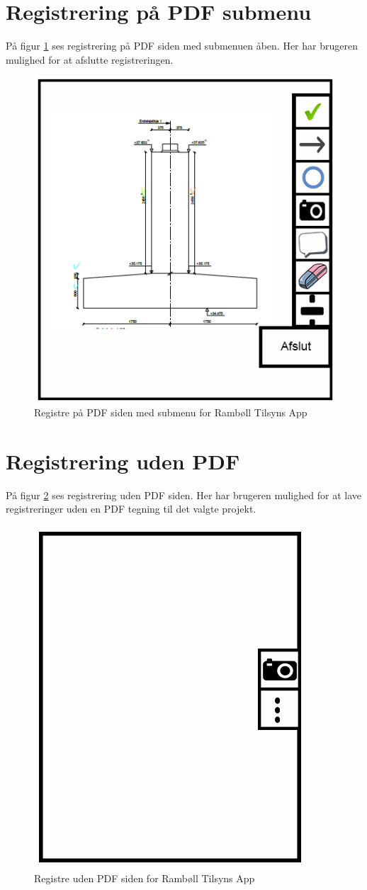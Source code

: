 \section{Registrering på PDF submenu}\label{sec:RegPaaPDFSubMock}
På figur \ref{fig:RegPaaPDFSubMock} ses registrering på PDF siden med submenuen åben. Her har brugeren mulighed for at afslutte registreringen.

\begin{figure}[H]
	\centering
	\includegraphics[width=0.4\linewidth]{MockUps/Mock/Ramboell-PDF-Reg-sub}
	\caption{Registre på PDF siden med submenu for Rambøll Tilsyns App}
	\label{fig:RegPaaPDFSubMock}
\end{figure}

\clearpage

\section{Registrering uden PDF}\label{sec:RegUdenPDFMock}
På figur \ref{fig:RegUdenPDFMock} ses registrering uden PDF siden. Her har brugeren mulighed for at lave registreringer uden en PDF tegning til det valgte projekt.

\begin{figure}[H]
	\centering
	\includegraphics[width=0.4\linewidth]{MockUps/Mock/Ramboell-TilsynUden}
	\caption{Registre uden PDF siden for Rambøll Tilsyns App}
	\label{fig:RegUdenPDFMock}
\end{figure}


